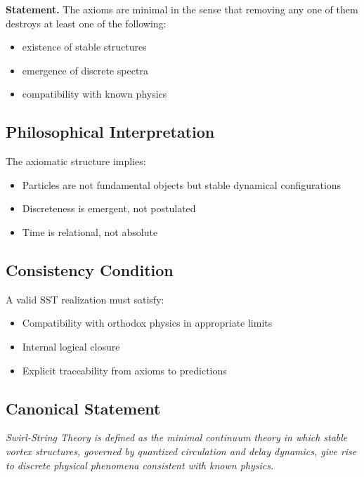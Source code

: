 \documentclass[11pt]{article}
\theoremstyle{definition}
\theoremstyle{plain}
\theoremstyle{remark}
\begin{document}
        \textbf{Statement.}
        The axioms are minimal in the sense that removing any one of them destroys at least one of the following:
        
        \begin{itemize}
            \item existence of stable structures
            \item emergence of discrete spectra
            \item compatibility with known physics
        \end{itemize}
    
    \subsection{Philosophical Interpretation}
        
        The axiomatic structure implies:
        
        \begin{itemize}
            \item Particles are not fundamental objects but stable dynamical configurations
            \item Discreteness is emergent, not postulated
            \item Time is relational, not absolute
        \end{itemize}
    
    \subsection{Consistency Condition}
        
        A valid SST realization must satisfy:
        
        \begin{itemize}
            \item Compatibility with orthodox physics in appropriate limits
            \item Internal logical closure
            \item Explicit traceability from axioms to predictions
        \end{itemize}
    
    \subsection{Canonical Statement}
        
        \begin{center}
            \textit{
                Swirl-String Theory is defined as the minimal continuum theory in which stable vortex structures, governed by quantized circulation and delay dynamics, give rise to discrete physical phenomena consistent with known physics.
            }
        \end{center}
\end{document}
